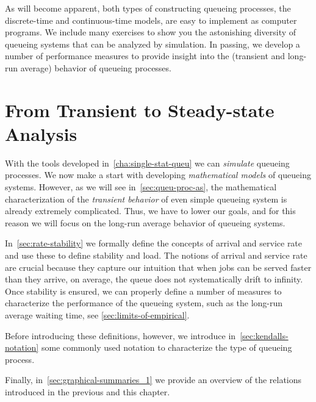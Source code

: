 As will become apparent, both types of constructing queueing processes, the discrete-time and continuous-time models, are easy to implement as computer programs.
We include many exercises to show you the astonishing diversity of queueing systems that can be analyzed by simulation.
In passing, we develop a number of performance measures to provide insight into the (transient and long-run average) behavior of queueing processes.








\chapter{From Transient to Steady-state Analysis}
\label{cha:from-trans-steady}


With the tools developed in~\cref{cha:single-stat-queu} we can \emph{simulate} queueing processes.
We now make a start with developing \emph{mathematical models} of queueing systems.
However, as we will see in~\cref{sec:queu-proc-as}, the mathematical characterization of the \emph{transient behavior} of even simple queueing system is already extremely complicated.
Thus, we have to lower our goals, and for this reason we will focus on the long-run average behavior of queueing systems.


In~\cref{sec:rate-stability} we formally define the concepts of arrival and service rate and use these to define stability and load.
The notions of arrival and service rate are crucial because they capture our intuition that when jobs can be served faster than they arrive, on average, the queue does not systematically drift to infinity.
Once stability is ensured, we can properly define a number of measures to characterize the performance of the queueing system, such as the long-run average waiting time, see \cref{sec:limits-of-empirical}.


Before introducing these definitions, however, we introduce in~\cref{sec:kendalls-notation} some commonly used notation to characterize the type of queueing process.

Finally,  in~\cref{sec:graphical-summaries_1} we provide an overview of the relations  introduced in the previous and this chapter.








